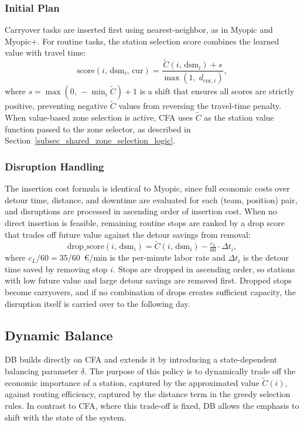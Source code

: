 \documentclass[12pt,oneside]{article}
\begin{document}
\subsubsection*{Initial Plan}
Carryover tasks are inserted first using nearest-neighbor, as in Myopic and Myopic+. For routine tasks, the station selection score combines the learned value with travel time:
\[
  \text{score}(i,\, \mathrm{dsm}_i,\, \mathrm{cur}) = \frac{\tilde{C}(i,\, \mathrm{dsm}_i) + s}{\max(1,\; d_{\mathrm{cur},i})},
\]
where $s = \max(0,\, -\min_i \tilde{C}) + 1$ is a shift that ensures all scores are strictly positive, preventing negative $\tilde{C}$ values from reversing the travel-time penalty. When value-based zone selection is active, CFA uses $\tilde{C}$ as the station value function passed to the zone selector, as described in Section~\ref{subsec_shared_zone_selection_logic}.

\subsubsection*{Disruption Handling}
The insertion cost formula is identical to Myopic, since full economic costs over detour time, distance, and downtime are evaluated for each (team, position) pair, and disruptions are processed in ascending order of insertion cost. When no direct insertion is feasible, remaining routine stops are ranked by a drop score that trades off future value against the detour savings from removal:
\[
  \text{drop\_score}(i,\, \mathrm{dsm}_i) = \tilde{C}(i,\, \mathrm{dsm}_i) - \tfrac{c_L}{60} \cdot \Delta t_i,
\]
where $c_L/60 = 35/60$~€/min is the per-minute labor rate and $\Delta t_i$ is the detour time saved by removing stop $i$. Stops are dropped in ascending order, so stations with low future value and large detour savings are removed first. Dropped stops become carryovers, and if no combination of drops creates sufficient capacity, the disruption itself is carried over to the following day.

\subsection{Dynamic Balance}\label{subsec_dynamic_balance}
DB builds directly on CFA and extends it by introducing a state-dependent balancing parameter $\delta$. The purpose of this policy is to dynamically trade off the economic importance of a station, captured by the approximated value $\tilde{C}(i)$, against routing efficiency, captured by the distance term in the greedy selection rules. In contrast to CFA, where this trade-off is fixed, DB allows the emphasis to shift with the state of the system.
\end{document}
